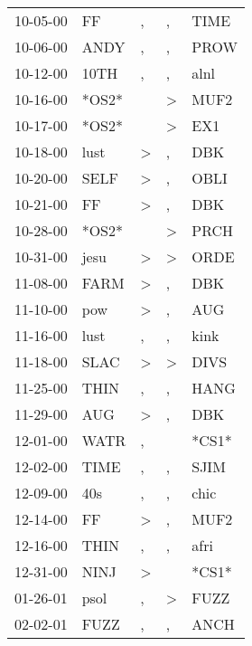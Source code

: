 \begin{supertabular}{lllll}
 10-05-00 &     FF &                , &                , &   TIME \\
 10-06-00 &   ANDY &                , &                , &   PROW \\
 10-12-00 &   10TH &                , &                , &   alnl \\
 10-16-00 &  *OS2* &                  &     \textgreater &   MUF2 \\
 10-17-00 &  *OS2* &                  &     \textgreater &    EX1 \\
 10-18-00 &   lust &     \textgreater &                , &    DBK \\
 10-20-00 &   SELF &     \textgreater &                , &   OBLI \\
 10-21-00 &     FF &     \textgreater &                , &    DBK \\
 10-28-00 &  *OS2* &                  &     \textgreater &   PRCH \\
 10-31-00 &   jesu &     \textgreater &     \textgreater &   ORDE \\
 11-08-00 &   FARM &     \textgreater &                , &    DBK \\
 11-10-00 &    pow &     \textgreater &                , &    AUG \\
 11-16-00 &   lust &                , &                , &   kink \\
 11-18-00 &   SLAC &     \textgreater &     \textgreater &   DIVS \\
 11-25-00 &   THIN &                , &                , &   HANG \\
 11-29-00 &    AUG &     \textgreater &                , &    DBK \\
 12-01-00 &   WATR &                , &                  &  *CS1* \\
 12-02-00 &   TIME &                , &                , &   SJIM \\
 12-09-00 &    40s &                , &                , &   chic \\
 12-14-00 &     FF &     \textgreater &                , &   MUF2 \\
 12-16-00 &   THIN &                , &                , &   afri \\
 12-31-00 &   NINJ &     \textgreater &                  &  *CS1* \\
 01-26-01 &   psol &                , &     \textgreater &   FUZZ \\
 02-02-01 &   FUZZ &                , &                , &   ANCH \\

\end{supertabular}
